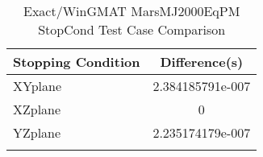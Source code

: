 \begin{table}[htbp!]
\centering
\caption{ Exact/WinGMAT MarsMJ2000EqPM StopCond Test Case Comparison}
      \begin{tabular}{lc}
      \hline\hline
          Stopping Condition & Difference(s) \\
         \hline
         XYplane & 2.384185791e-007 \\
         XZplane & 0 \\
         YZplane & 2.235174179e-007 \\
      \hline\hline
      \label{Table: Exact-WinGMAT MarsMJ2000EqPM StopCond Table} 
\end{tabular}
\end{table}
